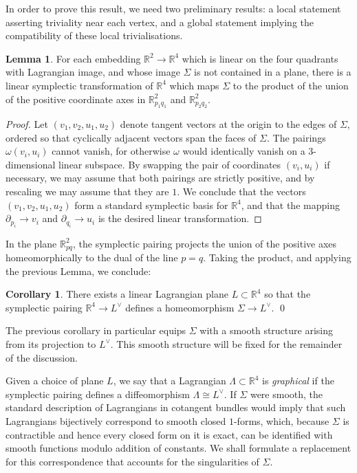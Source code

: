 \documentclass[11pt]{article}
\newcommand{\bR}{\mathbb{R}}
\theoremstyle{definition}
\newtheorem{lemma}{Lemma}
\newtheorem{corollary}{Corollary}
\begin{document}
  In order to prove this result, we need two preliminary results: a local statement asserting triviality near each vertex, and a global statement implying the compatibility of these local trivialisations.
  \begin{lemma} \label{lem:local_triviality}
    For each embedding $\bR^2 \to \bR^4$ which is linear on the four quadrants with Lagrangian image, and whose image $\Sigma$ is not contained in a plane, there is a linear symplectic transformation of $\bR^4$ which maps $\Sigma$ to the product of the union of the positive coordinate axes in $\bR^2_{p_1q_1}$ and  $\bR^2_{p_2q_2}$.
  \end{lemma}
  \begin{proof}
Let $(v_1,v_2,u_1,u_2)$ denote tangent vectors at the origin to the edges of $\Sigma$, ordered so that cyclically adjacent vectors span the faces of $\Sigma$. The pairings $\omega(v_i,u_i)$ cannot vanish, for otherwise $\omega$ would identically vanish on a $3$-dimensional linear subspace. By swapping the pair of coordinates $(v_i,  u_i) $ if necessary, we may assume that both pairings are strictly positive, and by rescaling we may assume that they are $1$. We conclude that the vectors $(v_1,v_2,u_1,u_2)$ form a standard symplectic basis for $\bR^4$, and that the mapping $\partial_{p_i} \to v_i$ and $\partial_{q_i} \to u_i$ is the desired linear transformation.
  \end{proof}
  In the plane $\bR^2_{pq}$, the symplectic pairing projects the union of the positive axes homeomorphically to the dual of the line $p=q$. Taking the product, and applying the previous Lemma, we conclude:
  \begin{corollary} \label{cor:dual_plane_local}
    There exists a linear Lagrangian plane $L \subset \bR^4$ so that the symplectic pairing $\bR^4 \to L^\vee$ defines a homeomorphism $\Sigma \to L^\vee$. \qed
  \end{corollary}
  The previous corollary in particular equips $\Sigma$ with a smooth structure arising from its projection to $L^\vee$. This smooth structure will be fixed for the remainder of the discussion.


  
 Given a choice of plane $L$, we say that a Lagrangian $\Lambda \subset \bR^4$ is \emph{graphical} if the symplectic pairing defines a diffeomorphism $ \Lambda \cong L^\vee$. If $\Sigma$ were smooth, the standard description of Lagrangians in cotangent bundles would imply that such Lagrangians bijectively correspond to smooth closed $1$-forms, which, because $\Sigma$ is contractible and hence every closed form on it is exact, can be identified with smooth functions modulo addition of constants. We shall formulate a replacement for this correspondence that accounts for the singularities of $\Sigma$.
  
\end{document}
